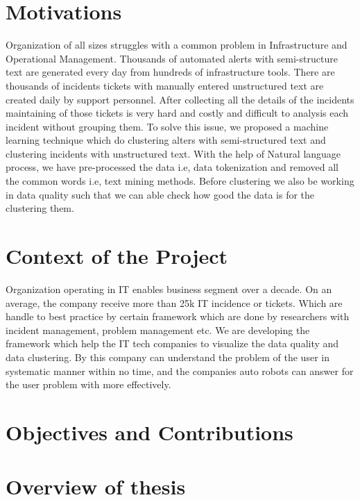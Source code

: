 \documentclass[a4paper,12pt]{report}
\begin{document}
    \section{Motivations}
    Organization of all sizes struggles with a common problem in Infrastructure and Operational Management. Thousands of automated alerts with semi-structure text are generated every day from hundreds of infrastructure tools. There are thousands of incidents tickets with manually entered unstructured text are created daily by support personnel. After collecting all the details of the incidents maintaining of those tickets is very hard and costly and difficult to analysis each incident without grouping them.
    \newline
    To solve this issue, we proposed a machine learning technique which do clustering alters with semi-structured text and clustering incidents with unstructured text. With the help of Natural language process, we have pre-processed the data i.e, data tokenization and removed all the common words i.e, text mining methods. Before clustering we also be working in data quality such that we can able check how good the data is for the clustering them.

    \section{Context of the Project}
    Organization operating in IT enables business segment over a decade. On an average, the company receive more than 25k IT incidence or tickets. Which are handle to best practice by certain framework which are done by researchers with incident management, problem management etc. 
    \newline
    We are developing the framework which help the IT tech companies to visualize the data quality and data clustering. By this company can understand the problem of the user in systematic manner within no time, and the companies  auto robots can answer for the user  problem with more effectively.
    
    \section{Objectives and Contributions}
    
    
    \section{Overview of thesis}
\end{document}
